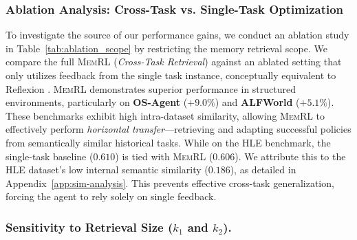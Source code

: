 \documentclass{article}
\theoremstyle{plain}
\theoremstyle{definition}
\theoremstyle{remark}
\begin{document}
\begin{table}[h]
\centering
\caption{\textbf{Ablation on Retrieval Scope.} We compare \textsc{MemRL} against an ablated version restricted to \textit{Single-Task Reflection}.}
\label{tab:ablation_scope}
\end{table}

\subsubsection{Ablation Analysis: Cross-Task vs. Single-Task Optimization}
\label{sec:ablation_scope}

To investigate the source of our performance gains, we conduct an ablation study in Table~\ref{tab:ablation_scope} by restricting the memory retrieval scope. We compare the full \textsc{MemRL} (\textit{Cross-Task Retrieval}) against an ablated setting that only utilizes feedback from the single task instance, conceptually equivalent to Reflexion \citep{shinn2023reflexion}. \textsc{MemRL} demonstrates superior performance in structured environments, particularly on \textbf{OS-Agent} ($+9.0\%$) and \textbf{ALFWorld} ($+5.1\%$). These benchmarks exhibit high intra-dataset similarity, allowing \textsc{MemRL} to effectively perform \textit{horizontal transfer}—retrieving and adapting successful policies from semantically similar historical tasks. While on the HLE benchmark, the single-task baseline ($0.610$) is tied with \textsc{MemRL} ($0.606$). We attribute this to the HLE dataset's low internal semantic similarity ($0.186$), as detailed in Appendix~\ref{app:sim-analysis}. This prevents effective cross-task generalization, forcing the agent to rely solely on single feedback.

\subsubsection{Sensitivity to Retrieval Size ($k_1$ and $k_2$).}
\end{document}
